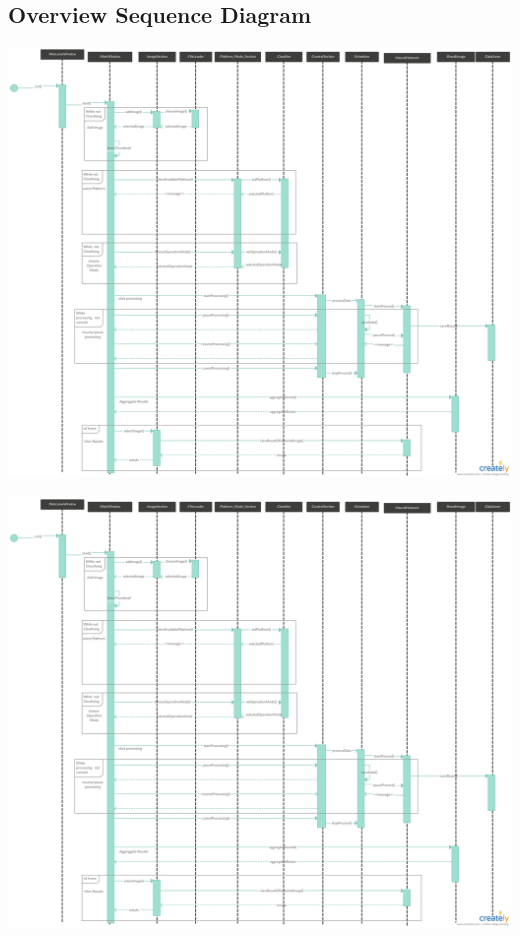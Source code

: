 \documentclass[parskip=full]{scrartcl}
\begin{document}
\subsection {Overview Sequence Diagram}

\begin{center}
\includegraphics[angle=90,origin=c,height=1.0\textwidth]{seq.png}
\end{center}

\pagebreak

\begin{center}
\includegraphics[angle=90,origin=c,height=0.99\textwidth,trim={0 800 0 0},clip]{seq.png}
\end{center}
\end{document}

